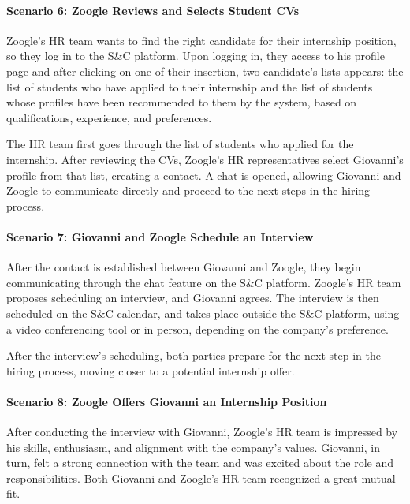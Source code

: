 \paragraph{Scenario 6: Zoogle Reviews and Selects Student CVs}

Zoogle's HR team wants to find the right candidate for their internship
position, so they log in to the S\&C platform. Upon logging in, they
access to his profile page and after clicking on one of their insertion,
two candidate's lists appears: the list of students who have applied to their
internship and the list of students whose profiles have been recommended to them by
the system, based on qualifications, experience, and preferences.

The HR team first goes through the list of students who applied for the
internship. After reviewing the CVs, Zoogle's HR representatives select
Giovanni's profile from that list, creating a contact. A chat is opened,
allowing Giovanni and Zoogle to communicate directly and proceed to the
next steps in the hiring process.


\paragraph{Scenario 7: Giovanni and Zoogle Schedule an Interview}

After the contact is established between Giovanni and Zoogle, they
begin communicating through the chat feature on the S\&C platform.
Zoogle's HR team proposes scheduling an interview, and
Giovanni agrees. The interview is then scheduled on the S\&C
calendar, and takes place outside the S\&C platform, using a
video conferencing tool or in person, depending on the company's
preference.

After the interview's scheduling, both parties prepare for the next step
in the hiring process, moving closer to a potential internship offer.


\paragraph{Scenario 8: Zoogle Offers Giovanni an Internship Position}

After conducting the interview with Giovanni, Zoogle's HR team is
impressed by his skills, enthusiasm, and alignment with the company's
values. Giovanni, in turn, felt a strong connection with the team and
was excited about the role and responsibilities. Both Giovanni and
Zoogle's HR team recognized a great mutual fit.

